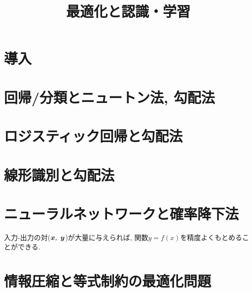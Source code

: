 \documentclass[dvipdfmx,a4j]{jsarticle}
\title{最適化と認識・学習}
\author{}
\begin{document}
\maketitle
\section{導入}

\section{回帰/分類とニュートン法, 勾配法}

\section{ロジスティック回帰と勾配法}

\section{線形識別と勾配法}

\section{ニューラルネットワークと確率降下法}
入力-出力の対($\mbox{\boldmath $x$},\ \mbox{\boldmath $y$}$)が大量に与えられば, 関数$y=f(x)$を精度よくもとめることができる.
\section{情報圧縮と等式制約の最適化問題}

\end{document}
